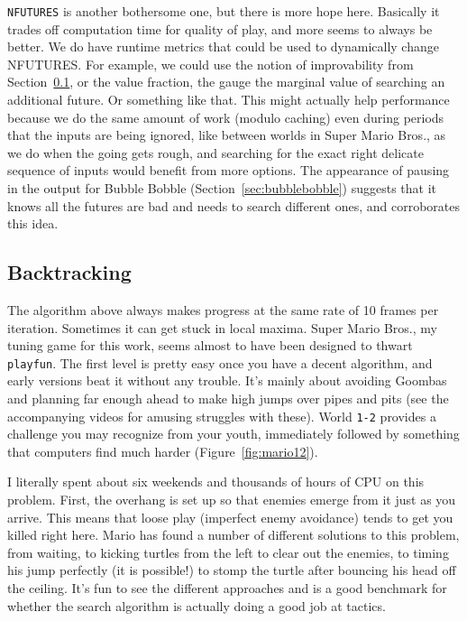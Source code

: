 \documentclass[twocolumn]{article}
\begin{document}
{  {\tt NFUTURES} is another bothersome one, but there is more hope here.
  Basically it trades off computation time for quality of play, and
  more seems to always be better. We do have runtime metrics that could
  be used to dynamically change NFUTURES. For example, we could use
  the notion of improvability from Section~\ref{sec:backtracking}, or
  the value fraction, the gauge the marginal value of searching an
  additional future. Or something like that. This might actually help
  performance because we do the same amount of work (modulo caching)
  even during periods that the inputs are being ignored, like between
  worlds in Super Mario Bros., as we do when the going gets rough,
  and searching for the exact right delicate sequence of inputs would
  benefit from more options. The appearance of pausing in the output
  for Bubble Bobble (Section~\ref{sec:bubblebobble}) suggests that it
  knows all the futures are bad and needs to search different ones,
  and corroborates this idea.}

\subsection{Backtracking} \label{sec:backtracking}

The algorithm above always makes progress at the same rate of 10
frames per iteration. Sometimes it can get stuck in local maxima.
Super Mario Bros., my tuning game for this work, seems almost to have
been designed to thwart {\tt playfun}. The first level is pretty easy
once you have a decent algorithm, and early versions beat it without
any trouble. It's mainly about avoiding Goombas and planning far
enough ahead to make high jumps over pipes and pits (see the
accompanying videos for amusing struggles with these). World {\tt 1-2}
provides a challenge you may recognize from your youth, immediately
followed by something that computers find much harder
(Figure~\ref{fig:mario12}).

I literally spent about six weekends and thousands of hours of CPU on
this problem. First, the overhang is set up so that enemies emerge
from it just as you arrive. This means that loose play (imperfect
enemy avoidance) tends to get you killed right here. Mario has found a
number of different solutions to this problem, from waiting, to
kicking turtles from the left to clear out the enemies, to timing his
jump perfectly (it is possible!) to stomp the turtle after bouncing his
head off the ceiling. It's fun to see the different approaches and is
a good benchmark for whether the search algorithm is actually doing a
good job at tactics.
\end{document}

